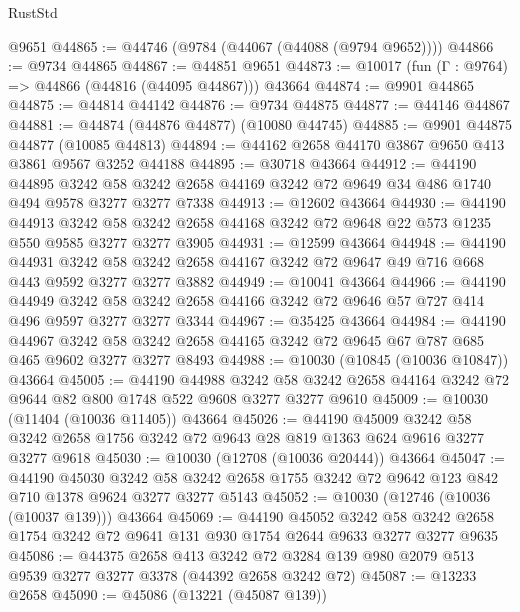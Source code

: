\begin{lexlean}{RustStd}
\begin{coremodule}
    @9651
@44865 := @44746 (@9784 (@44067 (@44088 (@9794 @9652))))
@44866 := @9734 @44865
@44867 := @44851 @9651
@44873 := @10017 (fun (Γ : @9764) => @44866 (@44816 (@44095 @44867))) @43664
@44874 := @9901 @44865
@44875 := @44814 @44142
@44876 := @9734 @44875
@44877 := @44146 @44867
@44881 := @44874 (@44876 @44877) (@10080 @44745)
@44885 := @9901 @44875 @44877 (@10085 @44813)
@44894 := @44162 @2658 @44170 @3867 @9650 @413 @3861 @9567 @3252 @44188
@44895 := @30718 @43664
@44912 := @44190
    @44895
    @3242
    @58
    @3242
    @2658
    @44169
    @3242
    @72
    @9649
    @34
    @486
    @1740
    @494
    @9578
    @3277
    @3277
    @7338
@44913 := @12602 @43664
@44930 := @44190
    @44913
    @3242
    @58
    @3242
    @2658
    @44168
    @3242
    @72
    @9648
    @22
    @573
    @1235
    @550
    @9585
    @3277
    @3277
    @3905
@44931 := @12599 @43664
@44948 := @44190
    @44931
    @3242
    @58
    @3242
    @2658
    @44167
    @3242
    @72
    @9647
    @49
    @716
    @668
    @443
    @9592
    @3277
    @3277
    @3882
@44949 := @10041 @43664
@44966 := @44190
    @44949
    @3242
    @58
    @3242
    @2658
    @44166
    @3242
    @72
    @9646
    @57
    @727
    @414
    @496
    @9597
    @3277
    @3277
    @3344
@44967 := @35425 @43664
@44984 := @44190
    @44967
    @3242
    @58
    @3242
    @2658
    @44165
    @3242
    @72
    @9645
    @67
    @787
    @685
    @465
    @9602
    @3277
    @3277
    @8493
@44988 := @10030 (@10845 (@10036 @10847)) @43664
@45005 := @44190
    @44988
    @3242
    @58
    @3242
    @2658
    @44164
    @3242
    @72
    @9644
    @82
    @800
    @1748
    @522
    @9608
    @3277
    @3277
    @9610
@45009 := @10030 (@11404 (@10036 @11405)) @43664
@45026 := @44190
    @45009
    @3242
    @58
    @3242
    @2658
    @1756
    @3242
    @72
    @9643
    @28
    @819
    @1363
    @624
    @9616
    @3277
    @3277
    @9618
@45030 := @10030 (@12708 (@10036 @20444)) @43664
@45047 := @44190
    @45030
    @3242
    @58
    @3242
    @2658
    @1755
    @3242
    @72
    @9642
    @123
    @842
    @710
    @1378
    @9624
    @3277
    @3277
    @5143
@45052 := @10030 (@12746 (@10036 (@10037 @139))) @43664
@45069 := @44190
    @45052
    @3242
    @58
    @3242
    @2658
    @1754
    @3242
    @72
    @9641
    @131
    @930
    @1754
    @2644
    @9633
    @3277
    @3277
    @9635
@45086 := @44375
    @2658
    @413
    @3242
    @72
    @3284
    @139
    @980
    @2079
    @513
    @9539
    @3277
    @3277
    @3378
    (@44392 @2658 @3242 @72)
@45087 := @13233 @2658
@45090 := @45086 (@13221 (@45087 @139))

\end{coremodule}
\end{lexlean}
